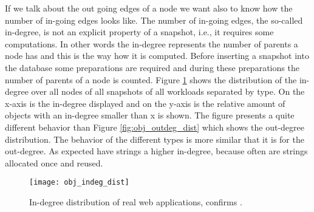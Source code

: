 If we talk about the out going edges of a node we want also to know how the number of in-going edges looks like. The number of in-going edges, the so-called in-degree, is not an explicit property of a snapshot, i.e., it requires some computations. In other words the in-degree represents the number of parents a node has and this is the way how it is computed. Before inserting a snapshot into the database some preparations are required and during these preparations the number of parents of a node is counted. Figure \ref{fig:obj_indeg_dist} shows the distribution of the in-degree over all nodes of all snapshots of all workloads separated by type. On the x-axis is the in-degree displayed and on the y-axis is the relative amount of objects with an in-degree smaller than x is shown. The figure presents a quite different behavior than Figure \ref{fig:obj_outdeg_dist} which shows the out-degree distribution. The behavior of the different types is more similar that it is for the out-degree. As expected have strings a higher in-degree, because often are strings allocated once and reused.
\begin{figure}
	\centering
	\texttt{[image: obj\_indeg\_dist]}
	\caption{In-degree distribution of real web applications, confirms \cite{JSMeter2009}.}
	\label{fig:obj_indeg_dist}
\end{figure}


